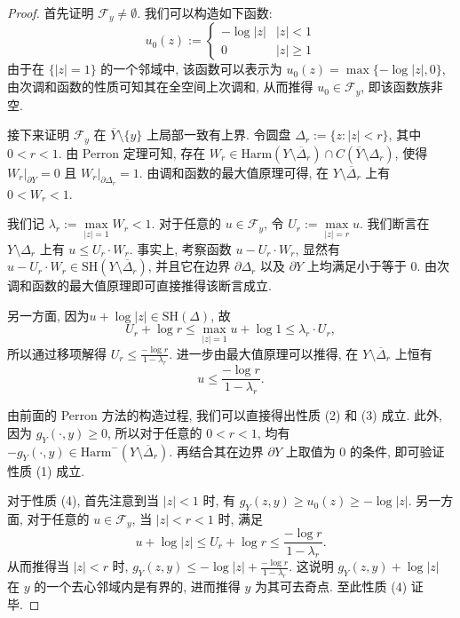 \begin{proof}
首先证明 $\mathcal{F}_y \neq \emptyset$. 我们可以构造如下函数:
\[
u_0(z) := 
\begin{cases} 
-\log|z| & |z| < 1 \\ 
0 & |z| \geqslant 1 
\end{cases}
\]
由于在 $\{|z| = 1\}$ 的一个邻域中, 该函数可以表示为 $u_0(z) = \max\{-\log|z|, 0\}$, 由次调和函数的性质可知其在全空间上次调和, 从而推得 $u_0 \in \mathcal{F}_y$, 即该函数族非空.

接下来证明 $\mathcal{F}_y$ 在 $\overline{Y} \setminus \{y\}$ 上局部一致有上界. 令圆盘 $\Delta_r := \{z : |z| < r\}$, 其中 $0 < r < 1$. 由 Perron 定理可知, 存在 $W_r \in \mathrm{Harm}(Y \setminus \overline{\Delta}_r) \cap C(\overline{Y} \setminus \Delta_r)$, 使得 $W_r|_{\partial Y} = 0$ 且 $W_r|_{\partial \Delta_r} = 1$. 由调和函数的最大值原理可得, 在 $Y \setminus \overline{\Delta}_r$ 上有 $0 < W_r < 1$. 

我们记 $\lambda_r := \max\limits_{|z|=1} W_r < 1$. 对于任意的 $u \in \mathcal{F}_y$, 令 $U_r := \max\limits_{|z|=r} u$. 我们断言在 $Y \setminus \Delta_r$ 上有 $u \leqslant U_r \cdot W_r$. 事实上, 考察函数 $u - U_r \cdot W_r$, 显然有 $u - U_r \cdot W_r \in \mathrm{SH}(Y \setminus \overline{\Delta}_r)$, 并且它在边界 $\partial \Delta_r$ 以及 $\partial Y$ 上均满足小于等于 $0$. 由次调和函数的最大值原理即可直接推得该断言成立.

另一方面, 因为$u + \log|z| \in \mathrm{SH}(\Delta)$, 故
\[ U_r + \log r \leqslant \max_{|z|=1} u + \log 1 \leqslant \lambda_r \cdot U_r, \]
所以通过移项解得 $U_r \leqslant \frac{-\log r}{1-\lambda_r}$. 进一步由最大值原理可以推得, 在 $Y \setminus \overline{\Delta}_r$ 上恒有
\[ u \leqslant \frac{-\log r}{1-\lambda_r}. \]

由前面的 Perron 方法的构造过程, 我们可以直接得出性质 (2) 和 (3) 成立. 
此外, 因为 $g_Y(\cdot, y) \geqslant 0$, 所以对于任意的 $0 < r < 1$, 均有 $-g_Y(\cdot, y) \in \mathrm{Harm}^-(Y \setminus \overline{\Delta}_r)$. 再结合其在边界 $\partial Y$ 上取值为 $0$ 的条件, 即可验证性质 (1) 成立.

对于性质 (4), 首先注意到当 $|z| < 1$ 时, 有 $g_Y(z, y) \geqslant u_0(z) \geqslant -\log|z|$. 另一方面, 对于任意的 $u \in \mathcal{F}_y$, 当 $|z| < r < 1$ 时, 满足
\[ u + \log|z| \leqslant U_r + \log r \leqslant \frac{-\log r}{1-\lambda_r}. \]
从而推得当 $|z| < r$ 时, $g_Y(z, y) \leqslant -\log|z| + \frac{-\log r}{1-\lambda_r}$. 这说明 $g_Y(z, y) + \log|z|$ 在 $y$ 的一个去心邻域内是有界的, 进而推得 $y$ 为其可去奇点. 至此性质 (4) 证毕.


\end{proof}
